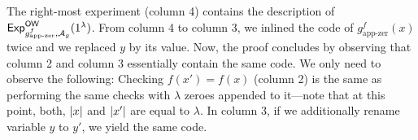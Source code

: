 \begin{center}
\begin{pchstack}
		    \pchspace
		\pchspace
				\pchspace
\end{pchstack}
\end{center}
The right-most experiment (column 4) contains the description of ${\mathsf{Exp}}_{g^f_{\text{app-zer}},\mathcal{A}_g}^{\mathsf{OW}}(1^\lambda)$.
From column 4 to column 3, we inlined the code of $g^f_{\text{app-zer}}(x)$ twice and we replaced $y$ by its value. Now, the proof concludes by observing that column 2 and column 3 essentially contain the same code. We only need to observe the following: Checking $f(x')=f(x)$ (column 2) is the same as performing the same checks with $\lambda$ zeroes appended to it---note that at this point, both, $\left\lvert x\right\rvert$ and  $\left\lvert x'\right\rvert$ are equal to $\lambda$. In column 3, if we additionally rename variable $y$ to $y'$, we yield the same code.

